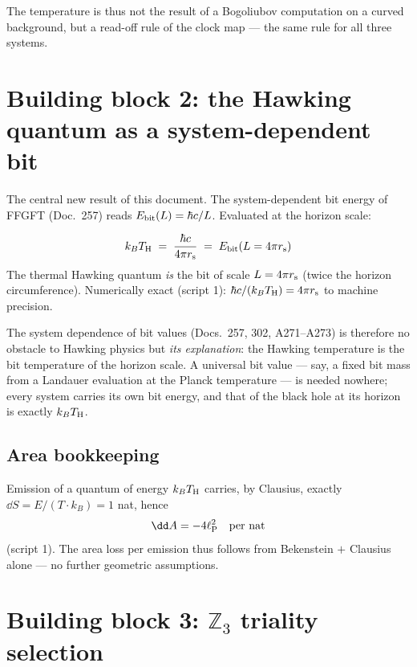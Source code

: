 The temperature is thus not the result of a Bogoliubov computation on
a curved background, but a read-off rule of the clock map — the same
rule for all three systems.

\section{Building block 2: the Hawking quantum as a system-dependent bit}

The central new result of this document. The system-dependent bit
energy of FFGFT (Doc.\ 257) reads $E_{\mathrm{bit}}(L) = \hbar c/L$.
Evaluated at the horizon scale:

\begin{tcolorbox}[ffgftbox, title={Core result \K}]
  \begin{equation}
    k_B T_{\mathrm{H}} \;=\; \frac{\hbar c}{4\pi r_{\mathrm{s}}}
    \;=\; E_{\mathrm{bit}}\!\left(L = 4\pi r_{\mathrm{s}}\right)
  \end{equation}
  The thermal Hawking quantum \emph{is} the bit of scale
  $L = 4\pi r_{\mathrm{s}}$ (twice the horizon circumference).
  Numerically exact (script 1): $\hbar c/(k_BT_{\mathrm{H}}) = 4\pi r_{\mathrm{s}}$ to
  machine precision.
\end{tcolorbox}

The system dependence of bit values (Docs.\ 257, 302, A271--A273)
is therefore no obstacle to Hawking physics but \emph{its explanation}:
the Hawking temperature is the bit temperature of the horizon scale.
A universal bit value — say, a fixed bit mass from a Landauer
evaluation at the Planck temperature — is needed nowhere; every system
carries its own bit energy, and that of the black hole at its horizon
is exactly $k_BT_{\mathrm{H}}$.

\subsection{Area bookkeeping}

Emission of a quantum of energy $k_BT_{\mathrm{H}}$ carries, by Clausius,
exactly $\dd S = E/(T\cdot k_B) = 1$ nat, hence
\begin{equation}
  \dd A = -4\lP^2 \quad\text{per nat}
\end{equation}
(script 1). The area loss per emission thus follows from
Bekenstein $+$ Clausius alone — no further geometric assumptions. \B

\section{Building block 3: \texorpdfstring{$\mathbb{Z}_3$}{Z3} triality selection}

